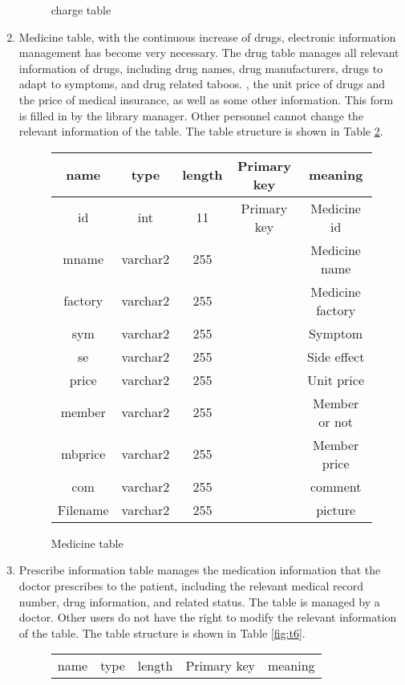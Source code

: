 \begin{enumerate}
\begin{figure}
\begin{tabular}{|c|c|c|c|c|}
\end{tabular}   
\caption{charge table}
    \label{fig:t4}
\end{figure}
\item Medicine table, with the continuous increase of drugs, electronic information management has become very necessary. The drug table manages all relevant information of drugs, including drug names, drug manufacturers, drugs to adapt to symptoms, and drug related taboos. , the unit price of drugs and the price of medical insurance, as well as some other information. This form is filled in by the library manager. Other personnel cannot change the relevant information of the table. The table structure is shown in Table \ref{fig:t5}.
\begin{figure}
    \centering
\begin{tabular}{|c|c|c|c|c|}
\hline
name & type & length & Primary key & meaning \\
\hline
id & int & 11 & Primary key & Medicine id\\
\hline
mname & varchar2 & 255 &  & Medicine name\\
\hline
factory & varchar2 & 255 &  & Medicine factory\\
\hline
sym & varchar2 & 255 &  &	Symptom\\
\hline
se & varchar2 & 255 &  &	Side effect\\
\hline
price & varchar2 & 255 &  & Unit price\\
\hline
member & varchar2 & 255 &  & Member or not\\
\hline
mbprice & varchar2 & 255 &  & Member price\\
\hline
com & varchar2 & 255 &  &	comment\\
\hline
Filename & varchar2 & 255 &  &	picture\\
\hline
\end{tabular}   
\caption{Medicine  table}
    \label{fig:t5}
\end{figure}
\item Prescribe information table manages the medication information that the doctor prescribes to the patient, including the relevant medical record number, drug information, and related status.  The table is managed by a doctor. Other users do not have the right to modify the relevant information of the table. The table structure is shown in Table \ref{fig:t6}.
\begin{figure}
    \centering
\begin{tabular}{|c|c|c|c|c|}
\hline
name & type & length & Primary key & meaning \\

\end{tabular}
\end{figure}
\end{enumerate}

